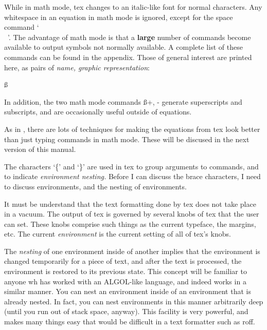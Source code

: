 While in math mode, tex changes to an italic-like font for normal
characters. Any whitespace in an equation in math mode is
ignored, except for the space command `\\\ '. The advantage of
math mode is that a {\bf large} number of commands become
available to output symbols not normally available.  A complete
list of these commands can be found in the appendix. Those of
general interest are printed here, as pairs of {\it name, graphic
representation}:{\ss{}

\lft{$\$$, $\$$}	\ctr{$\#$, $\#$}	
		
		
}

In addition, the two math mode commands {\ss +, -} generate
superscripts and subscripts, and are occasionally useful outside
of equations.

As in \tex, there are lots of techniques for making the equations
from tex look better than just typing commands in math mode.
These will be discused in the next version of this manual.


The characters `\{' and `\}' are used in tex to group arguments
to commands, and to indicate {\it environment nesting.} Before I
can discuss the brace characters, I need to discuss environments,
and the nesting of environments.

It must be understand that the text formatting done by tex does
not take place in a vacuum. The output of tex is governed by
several knobs of tex that the user can set. These knobs comprise
such things as the current typeface, the margins, etc. The
current {\it environment} is the current setting of all of tex's
knobs.

The {\it nesting} of one environment inside of another implies
that the environment is changed temporarily for a piece of text,
and after the text is processed, the environment is restored to
its previous state. This concept will be familiar to anyone wh
has worked with an ALGOL-like language, and indeed works in a
similar manner. You can nest an environment inside of an
environment that is already nested. In fact, you can nest
environments in this manner arbitrarily deep (until you run out
of stack space, anyway). This facility is very powerful, and
makes many things easy that would be difficult in a text
formatter such as roff.

